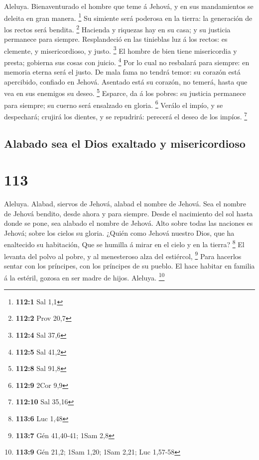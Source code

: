  Aleluya. Bienaventurado el hombre que teme á Jehová, y en
sus mandamientos se deleita en gran manera. \footnote{\textbf{112:1} Sal
  1,1}  Su simiente será poderosa en la tierra: la
generación de los rectos será bendita. \footnote{\textbf{112:2} Prov
  20,7}  Hacienda y riquezas hay en su casa; y su justicia
permanece para siempre.  Resplandeció en las tinieblas luz á
los rectos: es clemente, y misericordioso, y justo. \footnote{\textbf{112:4}
  Sal 37,6}  El hombre de bien tiene misericordia y presta;
gobierna sus cosas con juicio. \footnote{\textbf{112:5} Sal 41,2}
 Por lo cual no resbalará para siempre: en memoria eterna
será el justo.  De mala fama no tendrá temor: su corazón
está apercibido, confiado en Jehová.  Asentado está su
corazón, no temerá, hasta que vea en sus enemigos su deseo. \footnote{\textbf{112:8}
  Sal 91,8}  Esparce, da á los pobres: su justicia permanece
para siempre; su cuerno será ensalzado en gloria. \footnote{\textbf{112:9}
  2Cor 9,9}  Verálo el impío, y se despechará; crujirá los
dientes, y se repudrirá: perecerá el deseo de los impíos. \footnote{\textbf{112:10}
  Sal 35,16}

\hypertarget{alabado-sea-el-dios-exaltado-y-misericordioso}{%
\subsection{Alabado sea el Dios exaltado y
misericordioso}\label{alabado-sea-el-dios-exaltado-y-misericordioso}}

\hypertarget{section-112}{%
\section{113}\label{section-112}}

 Aleluya. Alabad, siervos de Jehová, alabad el nombre de
Jehová.  Sea el nombre de Jehová bendito, desde ahora y para
siempre.  Desde el nacimiento del sol hasta donde se pone,
sea alabado el nombre de Jehová.  Alto sobre todas las
naciones es Jehová; sobre los cielos su gloria.  ¿Quién como
Jehová nuestro Dios, que ha enaltecido su habitación,  Que
se humilla á mirar en el cielo y en la tierra? \footnote{\textbf{113:6}
  Luc 1,48}  El levanta del polvo al pobre, y al menesteroso
alza del estiércol, \footnote{\textbf{113:7} Gén 41,40-41; 1Sam 2,8}
 Para hacerlos sentar con los príncipes, con los príncipes
de su pueblo.  El hace habitar en familia á la estéril,
gozosa en ser madre de hijos. Aleluya. \footnote{\textbf{113:9} Gén
  21,2; 1Sam 1,20; 1Sam 2,21; Luc 1,57-58}

